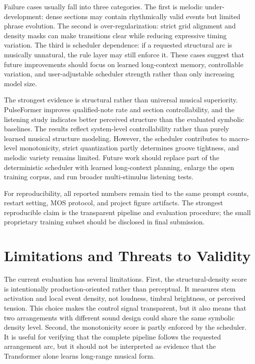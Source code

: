 \documentclass[conference]{conference-latex-template_10-17-19/IEEEtran}
\begin{document}
Failure cases usually fall into three categories. The first is melodic under-development: dense sections may contain rhythmically valid events but limited phrase evolution. The second is over-regularization: strict grid alignment and density masks can make transitions clear while reducing expressive timing variation. The third is scheduler dependence: if a requested structural arc is musically unnatural, the rule layer may still enforce it. These cases suggest that future improvements should focus on learned long-context memory, controllable variation, and user-adjustable scheduler strength rather than only increasing model size.

The strongest evidence is structural rather than universal musical superiority. PulseFormer improves qualified-note rate and section controllability, and the listening study indicates better perceived structure than the evaluated symbolic baselines. The results reflect system-level controllability rather than purely learned musical structure modeling. However, the scheduler contributes to macro-level monotonicity, strict quantization partly determines groove tightness, and melodic variety remains limited. Future work should replace part of the deterministic scheduler with learned long-context planning, enlarge the open training corpus, and run broader multi-stimulus listening tests.

For reproducibility, all reported numbers remain tied to the same prompt counts, restart setting, MOS protocol, and project figure artifacts. The strongest reproducible claim is the transparent pipeline and evaluation procedure; the small proprietary training subset should be disclosed in final submission.

\section{Limitations and Threats to Validity}
The current evaluation has several limitations. First, the structural-density score is intentionally production-oriented rather than perceptual. It measures stem activation and local event density, not loudness, timbral brightness, or perceived tension. This choice makes the control signal transparent, but it also means that two arrangements with different sound design could share the same symbolic density level. Second, the monotonicity score is partly enforced by the scheduler. It is useful for verifying that the complete pipeline follows the requested arrangement arc, but it should not be interpreted as evidence that the Transformer alone learns long-range musical form.
\end{document}
